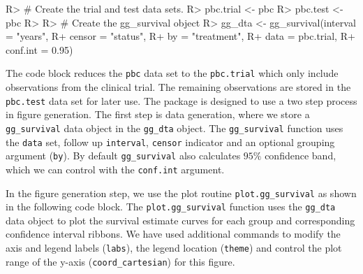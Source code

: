 \documentclass[article, nojss]{jss}
\begin{document}
\begin{Schunk}
\begin{Sinput}
R> # Create the trial and test data sets.
R> pbc.trial <- pbc %
R> pbc.test <- pbc %
R>
R> # Create the gg_survival object
R> gg_dta <- gg_survival(interval = "years",
R+                       censor = "status",
R+                       by = "treatment",
R+                       data = pbc.trial,
R+                       conf.int = 0.95)
\end{Sinput}
\end{Schunk}

The code block reduces the \texttt{pbc} data set to the
\texttt{pbc.trial} which only include observations from the clinical
trial. The remaining observations are stored in the \texttt{pbc.test}
data set for later use. The  package is designed to
use a two step process in figure generation. The first step is data
generation, where we store a \texttt{gg\_survival} data object in the
\texttt{gg\_dta} object. The \texttt{gg\_survival} function uses the
\texttt{data} set, follow up \texttt{interval}, \texttt{censor}
indicator and an optional grouping argument (\texttt{by}). By default
\texttt{gg\_survival} also calculates \(95\%\) confidence band, which we
can control with the \texttt{conf.int} argument.

In the figure generation step, we use the  plot
routine \texttt{plot.gg\_survival} as shown in the following code block.
The \texttt{plot.gg\_survival} function uses the \texttt{gg\_dta} data
object to plot the survival estimate curves for each group and
corresponding confidence interval ribbons. We have used additional
 commands to modify the axis and legend labels
(\texttt{labs}), the legend location (\texttt{theme}) and control the
plot range of the y-axis (\texttt{coord\_cartesian}) for this figure.
\end{document}
